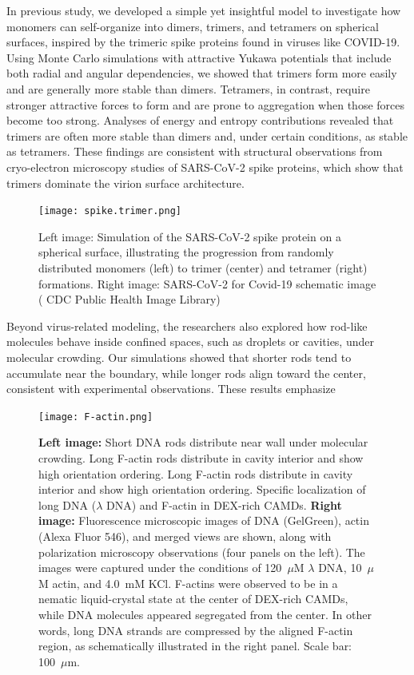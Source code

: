 \documentclass[12pt]{article}
\begin{document}
\begin{flushleft}
In previous study, we developed a simple yet insightful model to investigate how monomers can self-organize into dimers, trimers, and tetramers on spherical surfaces, inspired by the trimeric spike proteins found in viruses like COVID-19. Using Monte Carlo simulations with attractive Yukawa potentials that include both radial and angular dependencies, we showed that trimers form more easily and are generally more stable than dimers. Tetramers, in contrast, require stronger attractive forces to form and are prone to aggregation when those forces become too strong. Analyses of energy and entropy contributions revealed that trimers are often more stable than dimers and, under certain conditions, as stable as tetramers. These findings are consistent with structural observations from cryo-electron microscopy studies of SARS-CoV-2 spike proteins, which show that trimers dominate the virion surface architecture\cite{Ke2020}.

\begin{figure}[!ht]
  \centering
  \texttt{[image: spike.trimer.png]}
  \caption{Left image: Simulation of the SARS-CoV-2 spike protein on a spherical surface, illustrating the progression from randomly distributed monomers (left) to trimer (center) and tetramer (right) formations. Right image: SARS-CoV-2 for Covid-19 schematic image ( CDC Public
Health Image Library) \cite{cdc-covid}}
\end{figure}


Beyond virus-related modeling, the researchers also explored how rod-like molecules
behave inside confined spaces, such as droplets or cavities, under molecular crowding. Our simulations showed that shorter rods tend to accumulate near the boundary, while longer rods align toward the center, consistent with experimental observations. These results emphasize

\begin{figure}[!ht]
  \centering
   \texttt{[image: F-actin.png]}
 
  \caption{\textbf{Left image:} Short DNA rods distribute near wall under molecular crowding. Long F-actin rods distribute in cavity interior and show high orientation ordering. Long F-actin rods distribute in cavity interior and show high orientation ordering.  Specific localization of 
  long DNA ($\lambda$ DNA) and F-actin in DEX-rich CAMDs.    
       \textbf{Right image:} Fluorescence microscopic images of DNA (GelGreen), actin (Alexa Fluor 546), and merged views are shown, along with polarization microscopy observations (four panels on the left). 
        The images were captured under the conditions of 120~$\mu$M $\lambda$ DNA, 10~$\mu$M actin, and 4.0~mM KCl. 
        F-actins were observed to be in a nematic liquid-crystal state at the center of DEX-rich CAMDs, while DNA molecules appeared segregated from the center. 
        In other words, long DNA strands are compressed by the aligned F-actin region, as schematically illustrated in the right panel. 
        Scale bar: 100~$\mu$m.\cite {nakatani2018}}
\end{figure}




\end{flushleft}
\end{document}
